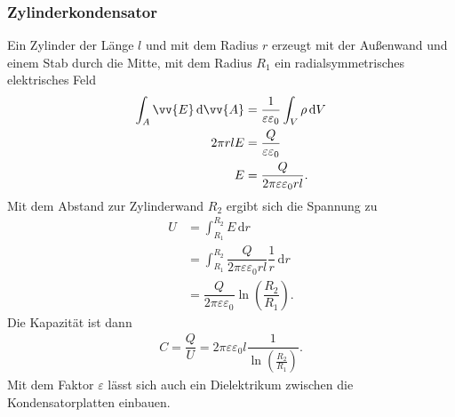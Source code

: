 \documentclass[a4paper,12pt]{article}
\newcommand{\td}{\,\text{d}}
\begin{document}
\subsubsection{Zylinderkondensator}
Ein Zylinder der Länge $l$ und mit dem Radius $r$ erzeugt mit der Außenwand und einem Stab durch die Mitte, mit dem Radius $R_1$ ein radialsymmetrisches elektrisches Feld
\begin{align*}
        \int_{A}^{}\vv{E}\td \vv{A}&=\dfrac{1}{\varepsilon \varepsilon _0}\int_{V}^{}\rho \td V\\
        2\pi rlE&=\dfrac{Q}{\varepsilon \varepsilon _0}\\
        E&=\dfrac{Q}{2\pi \varepsilon \varepsilon _0rl}
.\end{align*}
Mit dem Abstand zur Zylinderwand $R_2$ ergibt sich die Spannung zu
\begin{align*}
        U&=\int_{R_1}^{R_2}E\td r\\
         &=\int_{R_1}^{R_2}\dfrac{Q}{2\pi \varepsilon \varepsilon _0rl}\dfrac{1}{r}\td r\\
         &=\dfrac{Q}{2\pi \varepsilon \varepsilon _0}\ln \left(\dfrac{R_2}{R_1}\right)
.\end{align*}
Die Kapazität ist dann
\begin{align*}
        C=\dfrac{Q}{U}=2\pi \varepsilon \varepsilon _0l\dfrac{1}{\ln \left(\tfrac{R_2}{R_1}\right)}
.\end{align*}
Mit dem Faktor $\varepsilon $ lässt sich auch ein Dielektrikum zwischen die Kondensatorplatten einbauen.
\end{document}
